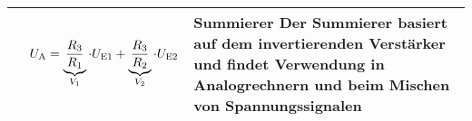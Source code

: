 \begin{table}[ht]
\begin{tabular}{|m{}|m{}|m{}|}
    

\centering


    &
    \begin{center}
    
\end{center}
\vspace{1ex}
\[
\begin{aligned}
    U_{\textnormal{A}} = \underbrace{\frac{R_3} {R_1}}_{V_1} \cdot U_{\textnormal{E1}} + \underbrace{\frac{R_3} {R_2}}_{V_2} \cdot U_{\textnormal{E2}}
\end{aligned}
\]
    & 
    \textbf{Summierer}\newline
    Der Summierer basiert auf dem invertierenden Verstärker und findet Verwendung in Analogrechnern und beim Mischen von Spannungssignalen
    \\ %
    \hline
    
    \end{tabular}
\end{table}


\newpage












